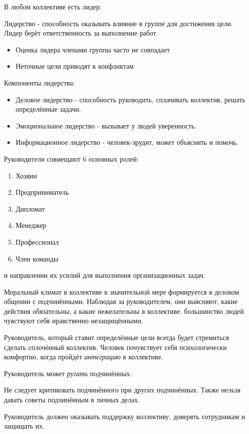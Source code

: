 В любом коллективе есть лидер.

Лидерство - способность оказывать влияние в группе для достижения цели. Лидер берёт ответственность за выполнение работ.

\begin{itemize}
    \item Оценка лидера членами группы часто не совпадает
    \item Неточные цели приводят к конфликтам
\end{itemize}

Компоненты лидерства:
\begin{itemize}
    \item Деловое лидерство - способность руководить, сплачивать коллектив, решать определённые задачи.
    \item Эмоциональное лидерство - вызывает у людей уверенность.
    \item Информационное лидерство - человек-эрудит, может объяснить и помочь.
\end{itemize}

Руководители совмещают 6 основных ролей:
\begin{enumerate}
    \item Хозяин
    \item Предприниматель
    \item Дипломат
    \item Менеджер
    \item Профессионал
    \item Член команды
\end{enumerate}

\missed{} и направлении их усилий для выполнения организационных задач.

Моральный климат в коллективе в значительной мере формируется в деловом общении с подчинёнными. Наблюдая за руководителем, они выясняют, какие действия обязательны, а какие нежелательны в коллективе.
\missed{} большинство людей чувствуют себя нравственно незащищёнными.

Руководитель, который ставит определённые цели всегда будет стремиться сделать сплочённый коллектив. Человек почувствует себя психологически комфортно, когда пройдёт \textit{интеграцию} в коллективе.

Руководитель может \textit{ругать} подчинённых.

Не следует критиковать подчинённого при других подчинённых. Также нельзя давать советы подчинённым в личных делах.

Руководитель должен оказывать поддержку коллективу, доверять сотрудникам и защищать их.

